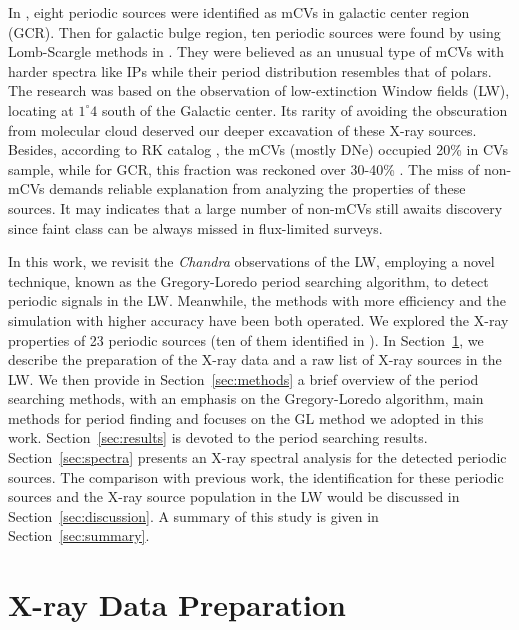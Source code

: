 \documentclass[fleqn,usenatbib]{mnras}
\begin{document}
In \citet{2003ApJ...599..465M}, eight periodic sources were identified as mCVs in galactic center region (GCR). Then for galactic bulge region, ten periodic sources were found by using Lomb-Scargle methods in \citet{2012ApJ...746..165H}. They were believed as an unusual type of mCVs with harder spectra like IPs while their period distribution resembles that of polars. The research was based on the observation of low-extinction Window fields (LW), locating at $1^{\circ}4$ south of the Galactic center. Its rarity of avoiding the obscuration from molecular cloud deserved our deeper excavation of these X-ray sources. 
Besides, according to RK catalog \citep{2003A&A...404..301R}, the mCVs (mostly DNe) occupied 20\% in CVs sample, while for GCR, this fraction was reckoned over 30-40\% \citep{2016ApJ...826..160H,2012ApJ...746..165H}. The miss of non-mCVs demands reliable explanation from analyzing the properties of these sources. It may indicates that a large number of non-mCVs still awaits discovery since faint class can be always missed in flux-limited surveys.

In this work, we revisit the {\it Chandra} observations of the LW, employing a novel technique, known as the Gregory-Loredo period searching algorithm, to detect periodic signals in the LW. Meanwhile, the methods with more efficiency and the simulation with higher accuracy have been both operated. 
We explored the X-ray properties of 23 periodic sources (ten of them identified in \citealt{2012ApJ...746..165H}). 
In Section~\ref{sec:obs}, we describe the preparation of the X-ray data and a raw list of X-ray sources in the LW.
We then provide in Section~\ref{sec:methods} a brief overview of the period searching methods, with an emphasis on the Gregory-Loredo algorithm, main methods for period finding and focuses on the GL method we adopted in this work. 
Section~\ref{sec:results} is devoted to the period searching results.
Section~\ref{sec:spectra} presents an X-ray spectral analysis for the detected periodic sources. 
The comparison with previous work, the identification for these periodic sources and the X-ray source population in the LW would be discussed in Section~\ref{sec:discussion}.
A summary of this study is given in Section~\ref{sec:summary}.

\section{X-ray Data Preparation} \label{sec:obs}
\end{document}
